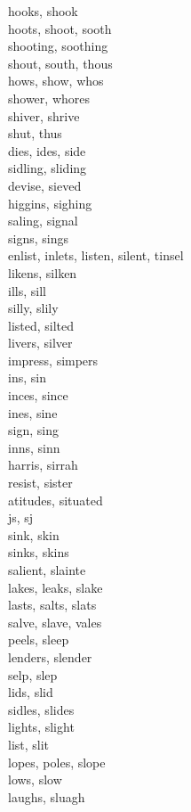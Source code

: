 hooks, shook\\
hoots, shoot, sooth\\
shooting, soothing\\
shout, south, thous\\
hows, show, whos\\
shower, whores\\
shiver, shrive\\
shut, thus\\
dies, ides, side\\
sidling, sliding\\
devise, sieved\\
higgins, sighing\\
saling, signal\\
signs, sings\\
enlist, inlets, listen, silent, tinsel\\
likens, silken\\
ills, sill\\
silly, slily\\
listed, silted\\
livers, silver\\
impress, simpers\\
ins, sin\\
inces, since\\
ines, sine\\
sign, sing\\
inns, sinn\\
harris, sirrah\\
resist, sister\\
atitudes, situated\\
js, sj\\
sink, skin\\
sinks, skins\\
salient, slainte\\
lakes, leaks, slake\\
lasts, salts, slats\\
salve, slave, vales\\
peels, sleep\\
lenders, slender\\
selp, slep\\
lids, slid\\
sidles, slides\\
lights, slight\\
list, slit\\
lopes, poles, slope\\
lows, slow\\
laughs, sluagh\\

